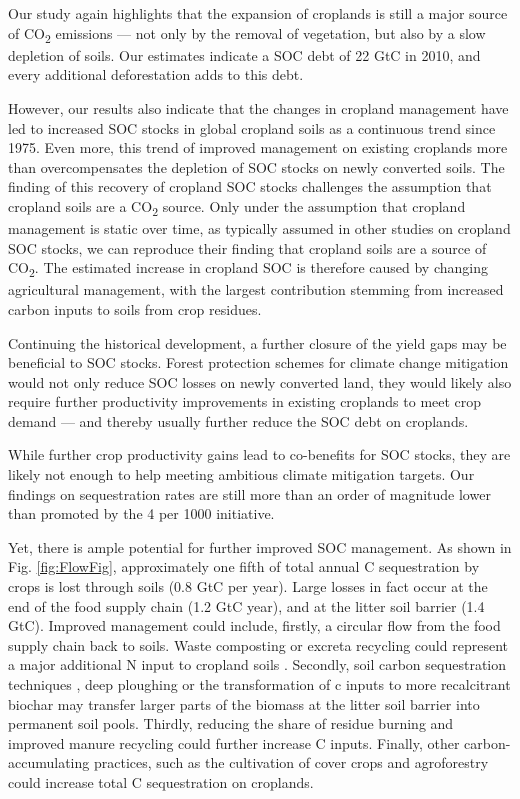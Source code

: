 \documentclass[gc, manuscript]{copernicus}
\begin{document}
Our study again highlights that the expansion of croplands is still a major source of CO\textsubscript{2} emissions --- not only by the removal of vegetation, but also by a slow depletion of soils. Our estimates indicate a SOC debt of 22 GtC in 2010, and every additional deforestation adds to this debt.

However, our results also indicate that the changes in cropland management have led to increased SOC stocks in global cropland soils as a continuous trend since 1975. Even more, this trend of improved management on existing croplands more than overcompensates the depletion of SOC stocks on newly converted soils. The finding of this recovery of cropland SOC stocks challenges the assumption that cropland soils are a CO\textsubscript{2} source. Only under the assumption that cropland management is static over time, as typically assumed in other studies on cropland SOC stocks, we can reproduce their finding that cropland soils are a source of CO\textsubscript{2}. The estimated increase in cropland SOC is therefore caused by changing agricultural management, with the largest contribution stemming from increased carbon inputs to soils from crop residues.

Continuing the historical development, a further closure of the yield gaps may be beneficial to SOC stocks. Forest protection schemes for climate change mitigation would not only reduce SOC losses on newly converted land, they would likely also require further productivity improvements in existing croplands to meet crop demand \citep{popp_land-use_2014-1} --- and thereby usually further reduce the SOC debt on croplands.

While further crop productivity gains lead to co-benefits for SOC stocks, they are likely not enough to help meeting ambitious climate mitigation targets. Our findings on sequestration rates are still more than an order of magnitude lower than promoted by the 4 per 1000 initiative.

Yet, there is ample potential for further improved SOC management. As shown in Fig. \ref{fig:FlowFig}, approximately one fifth of total annual C sequestration by crops is lost through soils (0.8 GtC per year). Large losses in fact occur at the end of the food supply chain (1.2 GtC year), and at the litter soil barrier (1.4 GtC). Improved management could include, firstly, a circular flow from the food supply chain back to soils. Waste composting or excreta recycling could represent a major additional N input to cropland soils \citep{brenzinger_organic_2018}. Secondly, soil carbon sequestration techniques \citep{smith_soil_2016}, deep ploughing \citep{alcantara_deep_2016} or the transformation of c inputs to more recalcitrant biochar \citep{woolf_sustainable_2010} may transfer larger parts of the biomass at the litter soil barrier into permanent soil pools. Thirdly, reducing the share of residue burning and improved manure recycling could further increase C inputs. Finally, other carbon-accumulating practices, such as the cultivation of cover crops \citep{poeplau_carbon_2015} and agroforestry \citep{lorenz_soil_2014} could increase total C sequestration on croplands.
\end{document}
